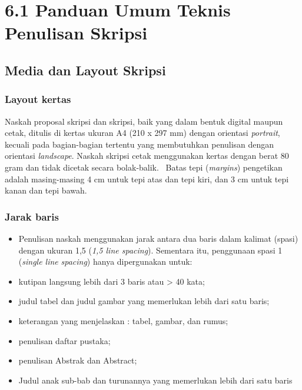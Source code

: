 \documentclass[
  indonesian,
  letterpaper,
]{scrbook}
\providecommand{\tightlist}{%
  \setlength{\itemsep}{0pt}\setlength{\parskip}{0pt}}
\begin{document}
\section{6.1 Panduan Umum Teknis Penulisan
Skripsi}\label{panduan-umum-teknis-penulisan-skripsi}

\subsection{Media dan Layout Skripsi}\label{media-dan-layout-skripsi}

\subsubsection{Layout kertas}\label{layout-kertas}

Naskah proposal skripsi dan skripsi, baik yang dalam bentuk digital
maupun cetak, ditulis di kertas ukuran A4 (210 x 297 mm) dengan
orientasi \emph{portrait}, kecuali pada bagian-bagian tertentu yang
membutuhkan penulisan dengan orientasi \emph{landscape}. Naskah skripsi
cetak menggunakan kertas dengan berat 80 gram dan tidak dicetak secara
bolak-balik.~ Batas tepi (\emph{margins}) pengetikan adalah
masing-masing 4 cm untuk tepi atas dan tepi kiri, dan 3 cm untuk tepi
kanan dan tepi bawah.

\subsubsection{Jarak baris}\label{jarak-baris}

\begin{itemize}
\tightlist
\item
  Penulisan naskah menggunakan jarak antara dua baris dalam kalimat
  (spasi) dengan ukuran 1,5 (\emph{1,5 line spacing}). Sementara itu,
  penggunaan spasi 1 (\emph{single line} \emph{spacing}) hanya
  dipergunakan untuk:
\item
  kutipan langsung lebih dari 3 baris atau \textgreater{} 40 kata;
\item
  judul tabel dan judul gambar yang memerlukan lebih dari satu baris;
\item
  keterangan yang menjelaskan : tabel, gambar, dan rumus;
\item
  penulisan daftar pustaka;
\item
  penulisan Abstrak dan Abstract;
\item
  Judul anak sub-bab dan turunannya yang memerlukan lebih dari satu
  baris
\end{itemize}
\end{document}
